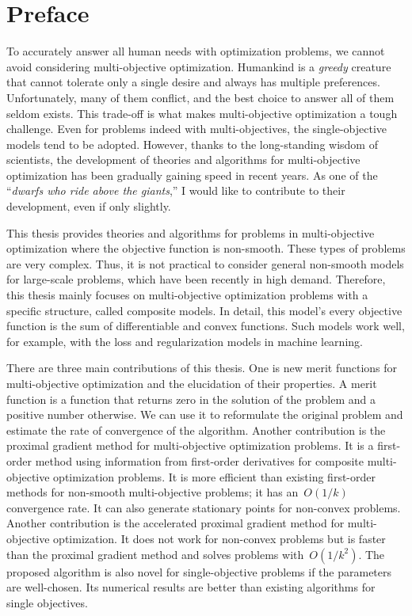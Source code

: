 \documentclass[../main]{subfiles}
\begin{document}
\chapter*{Preface}
To accurately answer all human needs with optimization problems, we cannot avoid considering multi-objective optimization.
Humankind is a \emph{greedy} creature that cannot tolerate only a single desire and always has multiple preferences.
Unfortunately, many of them conflict, and the best choice to answer all of them seldom exists. This trade-off is what makes multi-objective optimization a tough challenge.
Even for problems indeed with multi-objectives, the single-objective models tend to be adopted.
However, thanks to the long-standing wisdom of scientists, the development of theories and algorithms for multi-objective optimization has been gradually gaining speed in recent years.
As one of the ``\emph{dwarfs who ride above the giants},'' I would like to contribute to their development, even if only slightly.

This thesis provides theories and algorithms for problems in multi-objective optimization where the objective function is non-smooth. These types of problems are very complex.
Thus, it is not practical to consider general non-smooth models for large-scale problems, which have been recently in high demand.
Therefore, this thesis mainly focuses on multi-objective optimization problems with a specific structure, called composite models.
In detail, this model's every objective function is the sum of differentiable and convex functions.
Such models work well, for example, with the loss and regularization models in machine learning.

There are three main contributions of this thesis.
One is new merit functions for multi-objective optimization and the elucidation of their properties.
A merit function is a function that returns zero in the solution of the problem and a positive number otherwise.
We can use it to reformulate the original problem and estimate the rate of convergence of the algorithm.
Another contribution is the proximal gradient method for multi-objective optimization problems.
It is a first-order method using information from first-order derivatives for composite multi-objective optimization problems.
It is more efficient than existing first-order methods for non-smooth multi-objective problems; it has an~$O(1/k)$ convergence rate.
It can also generate stationary points for non-convex problems. Another contribution is the accelerated proximal gradient method for multi-objective optimization.
It does not work for non-convex problems but is faster than the proximal gradient method and solves problems with~$O(1/k^2)$.
The proposed algorithm is also novel for single-objective problems if the parameters are well-chosen.
Its numerical results are better than existing algorithms for single objectives.

\begin{flushright}
\TheAuthor \\
\TheDate
\end{flushright}
\end{document}
